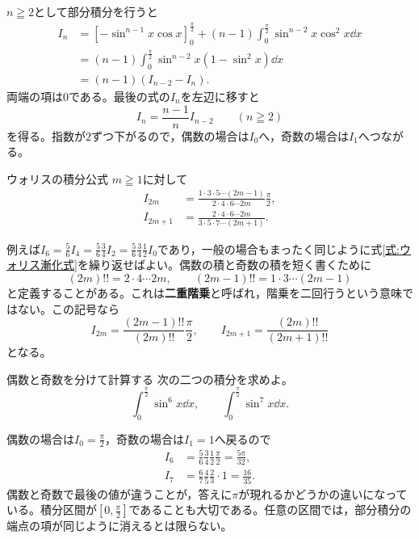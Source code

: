 $n\geqq2$として部分積分を行うと
\begin{align*}
 I_n
 &=\left[-\sin^{n-1}x\cos x\right]_0^{\frac{\pi}{2}}
 +(n-1)\int_0^{\frac{\pi}{2}}\sin^{n-2}x\cos^2x\dd x\\
 &=(n-1)\int_0^{\frac{\pi}{2}}\sin^{n-2}x(1-\sin^2x)\dd x\\
 &=(n-1)(I_{n-2}-I_n).
\end{align*}
両端の項は$0$である。最後の式の$I_n$を左辺に移すと
\begin{equation}\label{式:ウォリス漸化式}
 I_n=\frac{n-1}{n}I_{n-2}\qquad(n\geqq2)
\end{equation}
を得る。指数が$2$ずつ下がるので，偶数の場合は$I_0$へ，奇数の場合は$I_1$へつながる。

\begin{theorem}{ウォリスの積分公式}
$m\geqq1$に対して
\begin{align}
 I_{2m}
 &=\frac{1\cdot3\cdot5\cdots(2m-1)}{2\cdot4\cdot6\cdots2m}
   \frac{\pi}{2},\label{式:ウォリス偶数}\\
 I_{2m+1}
 &=\frac{2\cdot4\cdot6\cdots2m}{3\cdot5\cdot7\cdots(2m+1)}.
 \label{式:ウォリス奇数}
\end{align}
\end{theorem}

例えば$I_6=\frac56I_4=\frac56\frac34I_2=\frac56\frac34\frac12I_0$であり，一般の場合もまったく同じように式\eqref{式:ウォリス漸化式}を繰り返せばよい。偶数の積と奇数の積を短く書くために
\[
 (2m)!!=2\cdot4\cdots2m,\qquad
 (2m-1)!!=1\cdot3\cdots(2m-1)
\]
と定義することがある。これは\textbf{二重階乗}と呼ばれ，階乗を二回行うという意味ではない。この記号なら
\[
 I_{2m}=\frac{(2m-1)!!}{(2m)!!}\frac{\pi}{2},\qquad
 I_{2m+1}=\frac{(2m)!!}{(2m+1)!!}
\]
となる。

\begin{example}{偶数と奇数を分けて計算する}
次の二つの積分を求めよ。
\[
 \int_0^{\frac{\pi}{2}}\sin^6x\dd x,\qquad
 \int_0^{\frac{\pi}{2}}\sin^7x\dd x.
\]
\end{example}

偶数の場合は$I_0=\frac{\pi}{2}$，奇数の場合は$I_1=1$へ戻るので
\begin{align*}
 I_6&=\frac56\frac34\frac12\frac{\pi}{2}
     =\frac{5\pi}{32},\\
 I_7&=\frac67\frac45\frac23\cdot1
     =\frac{16}{35}.
\end{align*}
偶数と奇数で最後の値が違うことが，答えに$\pi$が現れるかどうかの違いになっている。積分区間が$\left[0,\frac{\pi}{2}\right]$であることも大切である。任意の区間では，部分積分の端点の項が同じように消えるとは限らない。

